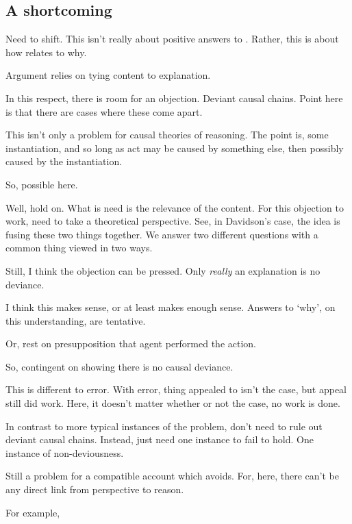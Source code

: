 \subsection{A shortcoming}
\label{sec:shortcoming}

\begin{note}
  \color{red}
  Need to shift.
  This isn't really about positive answers to \qzS{}.
  Rather, this is about how \qzS{} relates to why.
\end{note}

\begin{note}
  Argument relies on tying content to explanation.

  In this respect, there is room for an objection.
  Deviant causal chains.
  Point here is that there are cases where these come apart.

  This isn't only a problem for causal theories of reasoning.
  The point is, some instantiation, and so long as act may be caused by something else, then possibly caused by the instantiation.

  So, possible here.

  Well, hold on.
  What is need is the relevance of the content.
  For this objection to work, need to take a theoretical perspective.
  See, in Davidson's case, the idea is fusing these two things together.
  We answer two different questions with a common thing viewed in two ways.

  Still, I think the objection can be pressed.
  Only \emph{really} an explanation is no deviance.

  I think this makes sense, or at least makes enough sense.
  Answers to `why', on this understanding, are tentative.

  Or, rest on presupposition that agent performed the action.

  So, contingent on showing there is no causal deviance.

  This is different to error.
  With error, thing appealed to isn't the case, but appeal still did work.
  Here, it doesn't matter whether or not the case, no work is done.

  In contrast to more typical instances of the problem, don't need to rule out deviant causal chains.
  Instead, just need one instance to fail to hold.
  One instance of non-deviousness.

  Still a problem for a compatible account which avoids.
  For, here, there can't be any direct link from perspective to reason.

  For example, \citeauthor{Hieronymi:2011aa}


\end{note}
